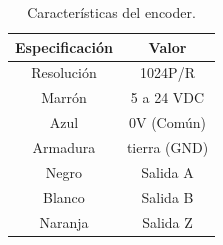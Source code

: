 \begin{table}[H]
    \centering
    \caption{Características del encoder.}
    \begin{tabular}{|c|c|} \hline
        Especificación & Valor \\ \hline
        Resolución & 1024P/R \\
        Marrón & 5 a 24 VDC \\
        Azul & 0V (Común) \\
        Armadura & tierra (GND) \\
        Negro & Salida A \\
        Blanco & Salida B \\
        Naranja & Salida Z \\ \hline
    \end{tabular}
    \label{tab:encoder}
\end{table}